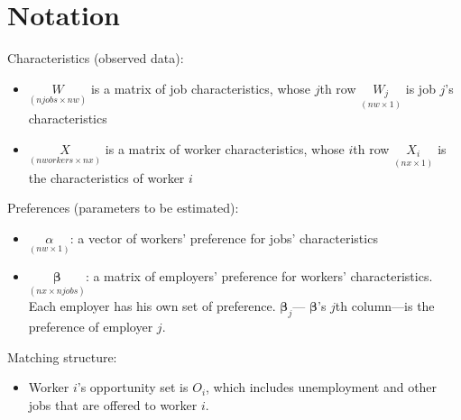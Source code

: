 \section{Notation}

Characteristics (observed data):
\begin{itemize}[noitemsep]
\item $\underset{(njobs \times nw)}{W}$ is a matrix of job characteristics, whose $j$th row $\underset{(nw \times 1)}{W_j}$ is job $j$'s characteristics
\item $\underset{(nworkers \times nx)}{X}$ is a matrix of worker characteristics, whose $i$th row $\underset{(nx \times 1)}{X_i}$ is the characteristics of worker $i$
\end{itemize}

Preferences (parameters to be estimated):
\begin{itemize}[noitemsep]
\item $\underset{(nw \times 1)}{\alpha}$: a vector of workers' preference for jobs' characteristics
\item $\underset{(nx \times njobs)}{\bm\beta}$: a matrix of employers' preference for workers' characteristics. Each employer has his own set of preference. $\bm\beta_j$--- $\bm\beta$'s $j$th column---is the preference of employer $j$.
\end{itemize}

Matching structure:
\begin{itemize}
\item Worker $i$'s opportunity set is $O_i$, which includes unemployment and other jobs that are offered to worker $i$.
\end{itemize}
